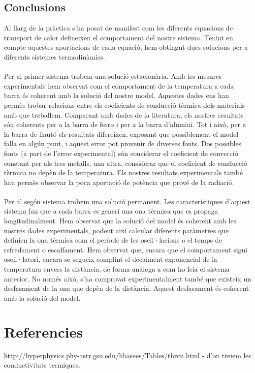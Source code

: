 \documentclass[12pt,twosides,onecolumn,openany]{article}
\begin{document}
\begin{multicols}{2}
\section{Conclusions}
Al llarg de la pràctica s'ha posat de manifest com les diferents equacions de transport de calor defineixen el comportament del nostre sistema. Tenint en compte aquestes aportacions de cada equació, hem obtingut dues solucions per a diferents sistemes termodinàmics.\\\\
Per al primer sistema trobem una solució estacionària. Amb les mesures experimentals hem observat com el comportament de la temperatura a cada barra és coherent amb la solució del nostre model. Aquestes dades ens han permès trobar relacions entre els coeficients de conducció tèrmica dels materials amb que treballem. Comparant amb dades de la literatura, els nostres resultats són coherents per a la barra de ferro i per a la barra d'alumini. Tot i això, per a la barra de llautó els resultats difereixen, exposant que possiblement el model falla en algún punt, i aquest error pot provenir de diverses fonts. Dos possibles fonts (a part de l'error experimental) són considerar el coeficient de convecció constant per als tres metalls, una altra, considerar que el coeficient de conducció tèrmica no depèn de la temperatura. Els nostres resultats experimentals també han permès observar la poca aportació de potència que prové de la radiació.\\\\
Per al segón sistema trobem una solució permanent. Les característiques d'aquest sistema fan que a cada barra es generi una ona tèrmica que es propaga longitudinalment. Hem observat que la solució del model és coherent amb les nostres dades experimentals, podent així calcular diferents paràmetres que definien la ona tèrmica com el període de les oscil·lacions o el temps de refredament o escalfament. Hem observat que, encara que el comportament sigui oscil·latori, encara se segueix complint el decaiment exponencial de la temperatura envers la distància, de forma anàloga a com ho feia el sistema anterior. No només això, s'ha comprovat experimentalment també que existeix un desfasament de la ona que depèn de la distància. Aquest desfasament és coherent amb la solució del model.
\end{multicols}
\section{Referencies}
http://hyperphysics.phy-astr.gsu.edu/hbasees/Tables/thrcn.html - d'on treiem les conductivitats termiques.
\end{document}
